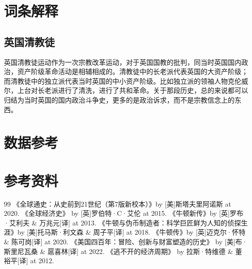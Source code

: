 \documentclass[12pt,oneside]{book}
\begin{document}
\chapter{词条解释}
\section{英国清教徒}
英国清教徒运动作为一次宗教改革运动，对于英国国教的批判，同当时英国国内政治，资产阶级革命活动是相辅相成的。清教徒中的长老派代表英国的大资产阶级；而清教徒中的独立派代表当时英国的中小资产阶级。比如独立派的领袖人物克伦威尔，上台对长老派进行了清洗，进行了共和革命。关于那段历史，总的来说都可以归结为当时英国的国内政治斗争史，更多的是政治诉求，而不是宗教信念上的东西。


\chapter{数据参考}



\backmatter
\chapter*{参考资料}
\begin{thebibliography}{99}
 《全球通史：从史前到21世纪（第7版新校本）》by [美]斯塔夫里阿诺斯 at 2020.
 《全球经济史》 by [英]罗伯特·C·艾伦 at 2015.
 《牛顿新传》by [英]罗布·艾利夫 \& 万兆元[译] at 2013.
 《牛顿与伪币制造者：科学巨匠鲜为人知的侦探生涯》by [美]托马斯·利文森 \& 周子平[译] at 2018. 
 《牛顿传》by [英]迈克尔·怀特 \& 陈可岗[译] at 2020.
 《美国四百年：冒险、创新与财富塑造的历史》 by [美]布·斯里尼瓦桑 \& 扈喜林[译] at 2022.
 《逃不开的经济周期》 by 拉斯·特维德 \& 董裕平[译] at 2012.
\end{thebibliography}
\end{document}
